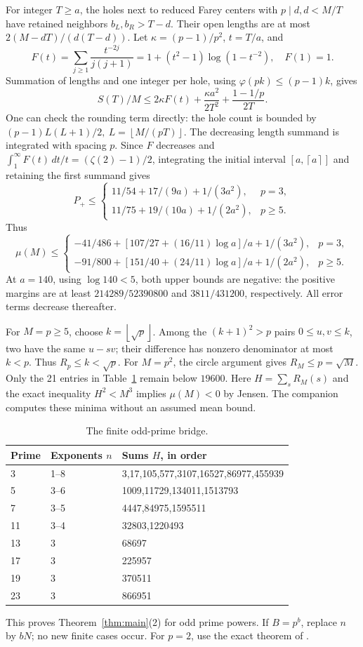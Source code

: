 \documentclass[11pt]{article}
\theoremstyle{definition}\newtheorem{definition}[theorem]{Definition}
\theoremstyle{remark}\newtheorem{remark}[theorem]{Remark}
\newcommand{\floor}[1]{\left\lfloor #1\right\rfloor}
\newcommand{\ceil}[1]{\left\lceil #1\right\rceil}
\begin{document}
For integer \(T\ge a\), the holes next to reduced Farey centers with
\(p\mid d,d<M/T\) have retained neighbors \(b_L,b_R>T-d\).
Their open lengths are at most \(2(M-dT)/(d(T-d))\).
Let \(\kappa=(p-1)/p^2\), \(t=T/a\), and
\[
 F(t)=\sum_{j\ge1}\frac{t^{-2j}}{j(j+1)}
     =1+(t^2-1)\log(1-t^{-2}),\quad F(1)=1.
\]
Summation of lengths and one integer per hole, using
\(\varphi(pk)\le(p-1)k\), gives
\[
 S(T)/M\le2\kappa F(t)+\frac{\kappa a^2}{2T^2}
                  +\frac{1-1/p}{2T}.              \tag{4.5}
\]
One can check the rounding term directly: the hole count is bounded by
\((p-1)L(L+1)/2,\ L=\floor{M/(pT)}\).
The decreasing length summand is integrated with spacing \(p\).
Since \(F\) decreases and
\(\int_1^\infty F(t)\,dt/t=(\zeta(2)-1)/2\), integrating the initial
interval \([a,\ceil a]\) and retaining the first summand gives
\[
 P_+\le
 \begin{cases}
 11/54+17/(9a)+1/(3a^2),&p=3,\\
 11/75+19/(10a)+1/(2a^2),&p\ge5.
 \end{cases}
\]
Thus
\[
 \mu(M)\le
 \begin{cases}
 -41/486+[107/27+(16/11)\log a]/a+1/(3a^2),&p=3,\\
 -91/800+[151/40+(24/11)\log a]/a+1/(2a^2),&p\ge5.
 \end{cases}                                      \tag{4.6}\label{eq:primeupper}
\]
At \(a=140\), using \(\log140<5\), both upper bounds are negative:
the positive margins are at least \(214289/52390800\) and
\(3811/431200\), respectively. All error terms decrease thereafter.

For \(M=p\ge5\), choose \(k=\floor{\sqrt p}\). Among the
\((k+1)^2>p\) pairs \(0\le u,v\le k\), two have the same \(u-sv\);
their difference has nonzero denominator at most \(k<p\).
Thus \(R_p\le k<\sqrt p\).
For \(M=p^2\), the circle argument gives \(R_M\le p=\sqrt M\).
Only the 21 entries in Table~\ref{tab:prime} remain below \(19600\).
Here \(H=\sum_sR_M(s)\) and the exact inequality \(H^2<M^3\)
implies \(\mu(M)<0\) by Jensen.
The companion computes these minima without an assumed mean bound.

\begin{table}[ht]
\centering
\begin{tabular}{lll}\toprule
Prime & Exponents \(n\) & Sums \(H\), in order\\\midrule
3 &1--8&3,17,105,577,3107,16527,86977,455939\\
5 &3--6&1009,11729,134011,1513793\\
7 &3--5&4447,84975,1595511\\
11&3--4&32803,1220493\\
13&3&68697\\
17&3&225957\\
19&3&370511\\
23&3&866951\\\bottomrule
\end{tabular}
\caption{The finite odd-prime bridge.}\label{tab:prime}
\end{table}
This proves Theorem~\ref{thm:main}(2) for odd prime powers.
If \(B=p^b\), replace \(n\) by \(bN\); no new finite cases occur.
For \(p=2\), use the exact theorem of \cite{binary}.
\end{document}
